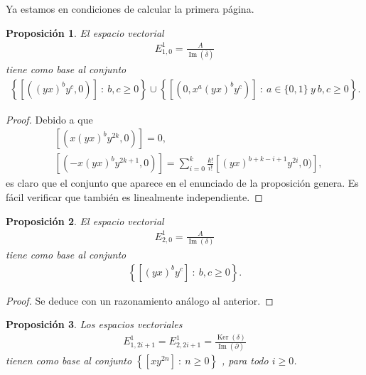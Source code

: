 \documentclass[a4paper,oneside,fleqn,11pt]{article}
\newtheorem{prop}{Proposición}
\numberwithin{prop}{subsection}
\DeclareMathOperator\Ima{Im}
\DeclareMathOperator\Ker{Ker}
\begin{document}
Ya estamos en condiciones de calcular la primera página. 
\begin{prop}
	El espacio vectorial
	\begin{align*}
		E_{1,0}^1 = \frac{A}{\Ima(\overline{\delta})}
	\end{align*}
	tiene como base al conjunto
	\begin{align*}
		\left\{ \left[((yx)^by^c, 0)\right]\ :\ b,c \geq 0\right\}
			\cup \left\{ \left[(0, x^a(yx)^by^c)\right]\ :\ a \in \{0, 1\}\ y\ b,c \geq 0\right\}. 
	\end{align*}
\end{prop}
\begin{proof}
	Debido a que
	\begin{align*}
		&\left[(x(yx)^by^{2k}, 0)\right] = 0, \\
		&\left[(-x(yx)^by^{2k + 1}, 0)\right] = \sum_{i = 0}^{k}\frac{k!}{i!}\left[(yx)^{b + k - i + 1}y^{2i}, 0)\right],
	\end{align*}
	es claro que el conjunto que aparece en el enunciado de la proposición genera. Es fácil verificar
	que también es linealmente independiente.
\end{proof}
\begin{prop}
	El espacio vectorial
	\begin{align*}
		E_{2,0}^1 = \frac{A}{\Ima(\delta)}
	\end{align*}
	tiene como base al conjunto
	\begin{align*}
		\left\{ \left[(yx)^by^c\right] \ :\ b,c \geq 0\right\}. 
	\end{align*}
\end{prop}
\begin{proof}
	Se deduce con un razonamiento análogo al anterior.
\end{proof}
\begin{prop}
	Los espacios vectoriales
	\begin{align*}
		E_{1,2i + 1}^1 = E_{2, 2i + 1}^1 = \frac{\Ker(\delta)}{\Ima(\partial)}
	\end{align*}
	tienen como base al conjunto $\left\{ \left[xy^{2n}\right] \ :\ n \geq 0\right\}$ , para todo $i \geq 0$.
\end{prop}
\end{document}
